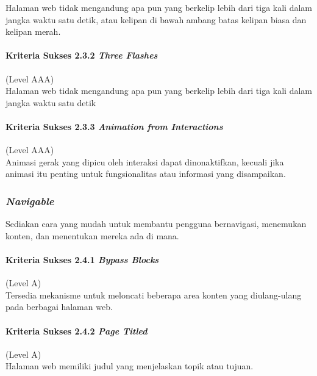 Halaman web tidak mengandung apa pun yang berkelip lebih dari tiga kali dalam jangka waktu satu detik, atau kelipan di bawah ambang batas kelipan biasa dan kelipan merah.

\paragraph{Kriteria Sukses 2.3.2 \textit{Three Flashes}}
\label{sec:kriteria_sukses_2.3.2}
(Level AAA)\\

Halaman web tidak mengandung apa pun yang berkelip lebih dari tiga kali dalam jangka waktu satu detik

\paragraph{Kriteria Sukses 2.3.3 \textit{Animation from Interactions}}
\label{sec:kriteria_sukses_2.3.3}
(Level AAA)\\

Animasi gerak yang dipicu oleh interaksi dapat dinonaktifkan, kecuali jika animasi itu penting untuk fungsionalitas atau informasi yang disampaikan.

\subsubsection{\textit{Navigable}}
\label{sec:navigable}
Sediakan cara yang mudah untuk membantu pengguna bernavigasi, menemukan konten, dan menentukan mereka ada di mana.

\paragraph{Kriteria Sukses 2.4.1 \textit{Bypass Blocks}}
\label{sec:kriteria_sukses_2.4.1}
(Level A)\\

Tersedia mekanisme untuk meloncati beberapa area konten yang diulang-ulang pada berbagai halaman web.

\paragraph{Kriteria Sukses 2.4.2 \textit{Page Titled}}
\label{sec:kriteria_sukses_2.4.2}
(Level A)\\

Halaman web memiliki judul yang menjelaskan topik atau tujuan.


